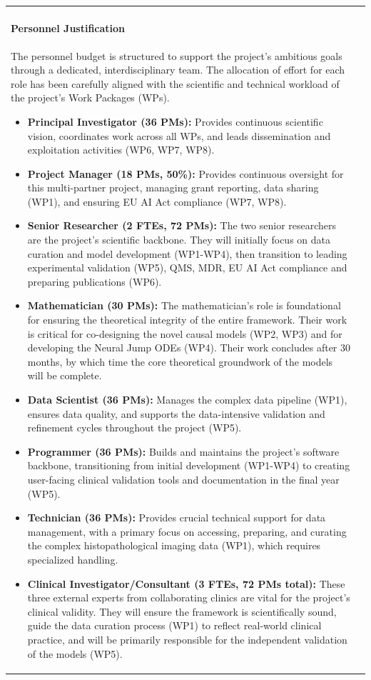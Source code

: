 \documentclass[11pt, a4paper]{article}
\begin{document}
\begin{longtable}{| p{} | p{} |}
\paragraph{Personnel Justification}
The personnel budget is structured to support the project's ambitious goals through a dedicated, interdisciplinary team. The allocation of effort for each role has been carefully aligned with the scientific and technical workload of the project's Work Packages (WPs).
\begin{itemize}
    \item \textbf{Principal Investigator (36 PMs):} Provides continuous scientific vision, coordinates work across all WPs, and leads dissemination and exploitation activities (WP6, WP7, WP8).
    \item \textbf{Project Manager (18 PMs, 50\%):} Provides continuous oversight for this multi-partner project, managing grant reporting, data sharing (WP1), and ensuring EU AI Act compliance (WP7, WP8).
    \item \textbf{Senior Researcher (2 FTEs, 72 PMs):} The two senior researchers are the project's scientific backbone. They will initially focus on data curation and model development (WP1-WP4), then transition to leading experimental validation (WP5), QMS, MDR, EU AI Act compliance and preparing publications (WP6).
    \item \textbf{Mathematician (30 PMs):} The mathematician's role is foundational for ensuring the theoretical integrity of the entire framework. Their work is critical for co-designing the novel causal models (WP2, WP3) and for developing the Neural Jump ODEs (WP4). Their work concludes after 30 months, by which time the core theoretical groundwork of the models will be complete.
    \item \textbf{Data Scientist (36 PMs):} Manages the complex data pipeline (WP1), ensures data quality, and supports the data-intensive validation and refinement cycles throughout the project (WP5).
    \item \textbf{Programmer (36 PMs):} Builds and maintains the project's software backbone, transitioning from initial development (WP1-WP4) to creating user-facing clinical validation tools and documentation in the final year (WP5).
    \item \textbf{Technician (36 PMs):} Provides crucial technical support for data management, with a primary focus on accessing, preparing, and curating the complex histopathological imaging data (WP1), which requires specialized handling.
    \item \textbf{Clinical Investigator/Consultant (3 FTEs, 72 PMs total):} These three external experts from collaborating clinics are vital for the project's clinical validity. They will ensure the framework is scientifically sound, guide the data curation process (WP1) to reflect real-world clinical practice, and will be primarily responsible for the independent validation of the models (WP5).

\end{itemize}
\end{longtable}
\end{document}
